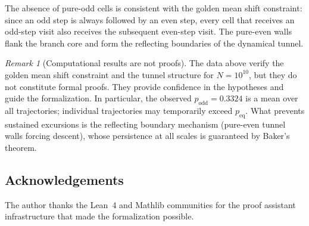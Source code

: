 \documentclass[manuscript]{aomart}
\theoremstyle{plain}
\theoremstyle{definition}
\theoremstyle{remark}
\newtheorem{remark}[theorem]{Remark}
\numberwithin{equation}{section}
\begin{document}
The absence of pure-odd cells is consistent with the golden mean
shift constraint: since an odd step is always followed by an even
step, every cell that receives an odd-step visit also receives the
subsequent even-step visit.  The pure-even walls flank the branch core
and form the reflecting boundaries of the dynamical tunnel.

\begin{remark}[Computational results are not proofs]
\label{rem:not-proof}
The data above verify the golden mean shift constraint and the tunnel
structure for $N = 10^{10}$, but they do not constitute formal proofs.
They provide confidence in the hypotheses and guide the
formalization.  In particular, the observed $p_{\mathrm{odd}} = 0.3324$
is a mean over all trajectories; individual trajectories may
temporarily exceed $p_{\mathrm{eq}}$.  What prevents sustained
excursions is the reflecting boundary mechanism (pure-even tunnel
walls forcing descent), whose persistence at all scales is guaranteed
by Baker's theorem.
\end{remark}


\subsection*{Acknowledgements}

The author thanks the Lean~4 and Mathlib communities for the proof
assistant infrastructure that made the formalization possible.

\end{document}
